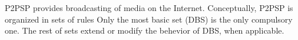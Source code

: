 P2PSP provides broadcasting of media on the Internet.  Conceptually,
P2PSP is organized in sets of rules Only the most basic set (DBS) is
the only compulsory one. The rest of sets extend or modify the
behevior of DBS, when applicable.
